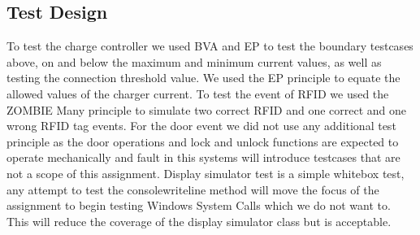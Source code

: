 \newpage

\subsection{Test Design}
To test the charge controller we used BVA and EP to test the boundary testcases above, on and below the maximum and minimum current values, as well as testing the connection threshold value. 
We used the EP principle to equate the allowed values of the charger current.
To test the event of RFID we used the ZOMBIE Many principle to simulate two correct RFID and one correct and one wrong RFID tag events. For the door event we did not use any additional test principle as the door operations and lock and unlock functions are expected to operate mechanically and fault in this systems will introduce testcases that are not a scope of this assignment. Display simulator test is a simple whitebox test, any attempt to test the consolewriteline method will move the focus of the assignment to begin testing Windows System Calls which we do not want to. This will reduce the coverage of the display simulator class but is acceptable.